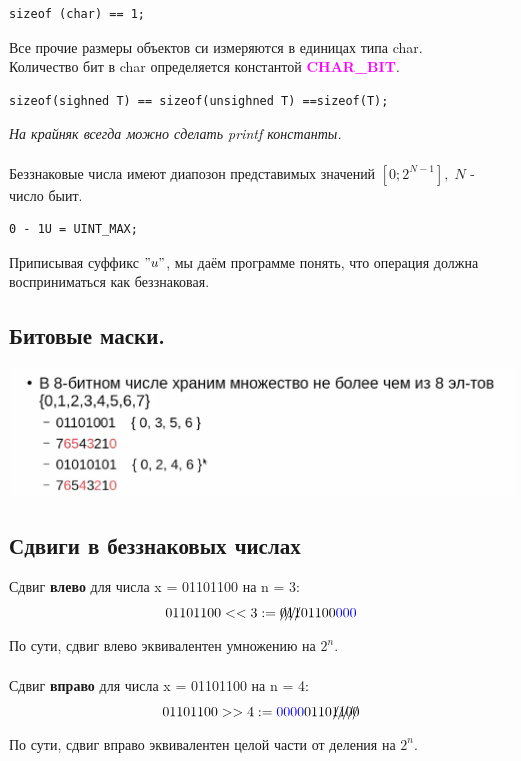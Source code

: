 \documentclass[12pt]{article}
\begin{document}
\begin{verbatim}
sizeof (char) == 1;
\end{verbatim}

Все прочие размеры объектов си измеряются в единицах типа char. \\ Количество бит в char определяется константой {\bf \textcolor{magenta}{CHAR\_BIT}}. 

\begin{verbatim}
sizeof(sighned T) == sizeof(unsighned T) ==sizeof(T);
\end{verbatim}

{\sl На крайняк всегда можно сделать printf константы.} \\
\\
Беззнаковые числа имеют диапозон представимых значений $[0; 2^{N - 1}], \; N$ - число быит. 

\begin{verbatim}
0 - 1U = UINT_MAX;
\end{verbatim}
Приписывая суффикс $"u"$, мы даём программе понять, что операция должна восприниматься как беззнаковая. 

\subsection{Битовые маски.}
\includegraphics[scale=0.5]{./masks.png} \\

\subsection{Сдвиги в беззнаковых числах}
Сдвиг {\bf влево} для числа x = 01101100 на n = 3: 
$$ 01101100 << 3 := \xout{011}01100 \textcolor{blue}{000} $$
По сути, сдвиг влево эквивалентен умножению на $2^{n}$. \\
\\
Сдвиг {\bf вправо} для числа x = 01101100 на n = 4:
$$ 01101100 >> 4 := \textcolor{blue}{0000}0110\xout{1100} $$
По сути, сдвиг вправо эквивалентен целой части от деления на $2^{n}.$
\end{document}
